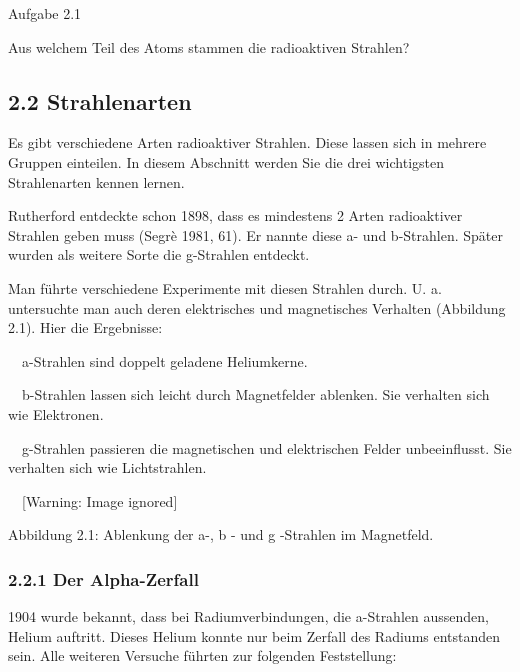 \documentclass[12pt,a4paper,twoside]{article}
\begin{document}
Aufgabe 2.1 

Aus welchem Teil des Atoms stammen die radioaktiven Strahlen?


\bigskip

\subsection[2.2 Strahlenarten]{2.2 Strahlenarten}

\bigskip

Es gibt verschiedene Arten radioaktiver Strahlen. Diese lassen sich in mehrere Gruppen einteilen. In diesem Abschnitt werden Sie die drei wichtigsten Strahlenarten kennen lernen.

Rutherford entdeckte schon 1898, dass es mindestens 2 Arten radioaktiver Strahlen geben muss (Segrè 1981, 61). Er nannte diese \textgreek{a}\nobreakdash- und \textgreek{b}\nobreakdash-Strahlen. Später wurden als weitere Sorte die \textgreek{g}\nobreakdash-Strahlen entdeckt. 

Man führte verschiedene Experimente mit diesen Strahlen durch. U. a. untersuchte man auch deren elektrisches und magnetisches Verhalten (Abbildung 2.1). Hier die Ergebnisse:

{\textbullet}\ \ \textgreek{a}\nobreakdash-Strahlen sind doppelt geladene Heliumkerne.

{\textbullet}\ \ \textgreek{b}\nobreakdash-Strahlen lassen sich leicht durch Magnetfelder ablenken. Sie verhalten sich wie Elektronen.

{\textbullet}\ \ \textgreek{g}\nobreakdash-Strahlen passieren die magnetischen und elektrischen Felder unbeeinflusst. Sie verhalten sich wie Lichtstrahlen.

\ \   [Warning: Image ignored] %
 

Abbildung 2.1: Ablenkung der \textgreek{a}\nobreakdash-, \textgreek{b} \nobreakdash- und \textgreek{g} \nobreakdash-Strahlen im Magnetfeld.


\bigskip

\subsubsection{2.2.1 Der Alpha\nobreakdash-Zerfall}

\bigskip

1904 wurde bekannt, dass bei Radiumverbindungen, die a\nobreakdash-Strahlen aussenden, Helium auftritt. Dieses Helium konnte nur beim Zerfall des Radiums entstanden sein. Alle weiteren Versuche führten zur folgenden Feststellung:
\end{document}
